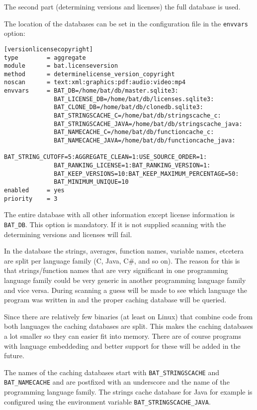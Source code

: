\documentclass[10pt]{article}
\begin{document}
The second part (determining versions and licenses) the full database is used.

The location of the databases can be set in the configuration file in
the \texttt{envvars} option:

\begin{verbatim}
[versionlicensecopyright]
type        = aggregate
module      = bat.licenseversion
method      = determinelicense_version_copyright
noscan      = text:xml:graphics:pdf:audio:video:mp4
envvars     = BAT_DB=/home/bat/db/master.sqlite3:
              BAT_LICENSE_DB=/home/bat/db/licenses.sqlite3:
              BAT_CLONE_DB=/home/bat/db/clonedb.sqlite3:
              BAT_STRINGSCACHE_C=/home/bat/db/stringscache_c:
              BAT_STRINGSCACHE_JAVA=/home/bat/db/stringscache_java:
              BAT_NAMECACHE_C=/home/bat/db/functioncache_c:
              BAT_NAMECACHE_JAVA=/home/bat/db/functioncache_java:
              BAT_STRING_CUTOFF=5:AGGREGATE_CLEAN=1:USE_SOURCE_ORDER=1:
              BAT_RANKING_LICENSE=1:BAT_RANKING_VERSION=1:
              BAT_KEEP_VERSIONS=10:BAT_KEEP_MAXIMUM_PERCENTAGE=50:
              BAT_MINIMUM_UNIQUE=10
enabled     = yes
priority    = 3
\end{verbatim}

The entire database with all other information except license information is
\texttt{BAT\_DB}. This option is mandatory. If it is not supplied scanning with
the determining versions and licenses will fail.

In the database the strings, averages, function names, variable names, etcetera
are split per language family (C, Java, C\#, and so on). The reason for this is
that strings/function names that are very significant in one programming
language family could be very generic in another programming language family
and vice versa. During scanning a guess will be made to see which language the
program was written in and the proper caching database will be queried.

Since there are relatively few binaries (at least on Linux) that combine
code from both languages the caching databases are split. This makes the
caching databases a lot smaller so they can easier fit into memory. There are
of course programs with language embeddeding and better support for these will
be added in the future.

The names of the caching databases start with \texttt{BAT\_STRINGSCACHE} and
\texttt{BAT\_NAMECACHE} and are postfixed with an underscore and the name of
the programming language family.  The strings cache database for Java for
example is configured using the environment variable
\texttt{BAT\_STRINGSCACHE\_JAVA}.
\end{document}
